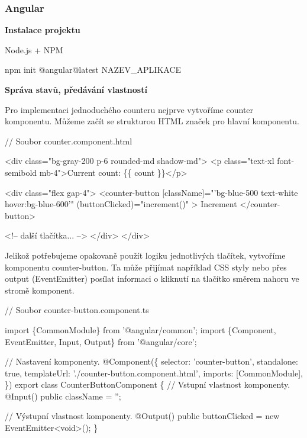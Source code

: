 \subsubsection{Angular}

\begin{flushleft}
  \textbf{Instalace projektu}
\end{flushleft}

\begin{citemize}
	\item Node.js + NPM
  \item npm init @angular@latest NAZEV\_APLIKACE
  \item {}
  \item {}
\end{citemize}

\begin{flushleft}
  \textbf{Správa stavů, předávání vlastností}
\end{flushleft}

Pro implementaci jednoduchého counteru nejprve vytvoříme counter komponentu. Můžeme začít se strukturou HTML značek pro hlavní komponentu.

\begin{prog}
// Soubor counter.component.html

<div class="bg-gray-200 p-6 rounded-md shadow-md">
  <p class="text-xl font-semibold mb-4">Current count: \{\{ count \}\}</p>

  <div class="flex gap-4">
    <counter-button
      [className]="'bg-blue-500 text-white hover:bg-blue-600'"
      (buttonClicked)="increment()"
    >
      Increment
    </counter-button>

    <!-- další tlačítka... -->
  </div>
</div>
\end{prog}

Jelikož potřebujeme opakovaně použít logiku jednotlivých tlačítek, vytvoříme komponentu counter-button. 
Ta může přijímat například CSS styly nebo přes output (EventEmitter) posílat informaci o kliknutí na tlačítko směrem nahoru ve stromě komponent.

\begin{prog}
// Soubor counter-button.component.ts

import \{CommonModule\} from '@angular/common';
import \{Component, EventEmitter, Input, Output\} from '@angular/core';

// Nastavení komponenty.
@Component(\{
  selector: 'counter-button',
  standalone: true,
  templateUrl: './counter-button.component.html',
  imports: [CommonModule],
\})
export class CounterButtonComponent \{
  // Vstupní vlastnost komponenty.
  @Input() public className = '';

  // Výstupní vlastnost komponenty.
  @Output() public buttonClicked = new EventEmitter<void>();
\}
\end{prog}

